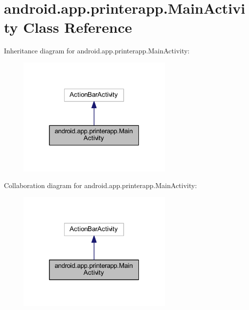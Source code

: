 \hypertarget{classandroid_1_1app_1_1printerapp_1_1_main_activity}{}\section{android.\+app.\+printerapp.\+Main\+Activity Class Reference}
\label{classandroid_1_1app_1_1printerapp_1_1_main_activity}


Inheritance diagram for android.\+app.\+printerapp.\+Main\+Activity\+:
\nopagebreak
\begin{figure}[H]
\begin{center}
\leavevmode
\includegraphics[width=217pt]{classandroid_1_1app_1_1printerapp_1_1_main_activity__inherit__graph}
\end{center}
\end{figure}


Collaboration diagram for android.\+app.\+printerapp.\+Main\+Activity\+:
\nopagebreak
\begin{figure}[H]
\begin{center}
\leavevmode
\includegraphics[width=217pt]{classandroid_1_1app_1_1printerapp_1_1_main_activity__coll__graph}
\end{center}
\end{figure}

